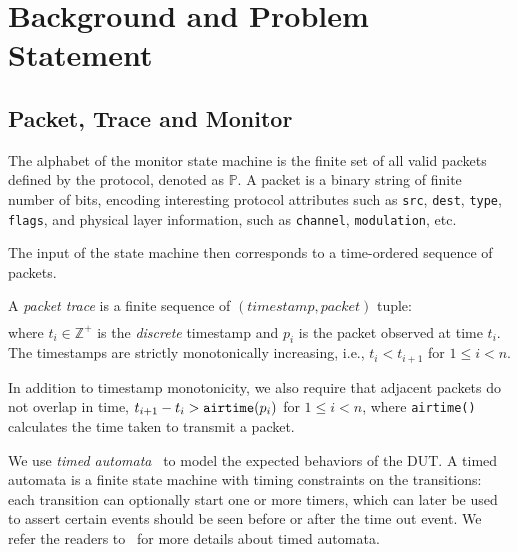 \section{Background and Problem Statement}
\label{sec:background}

\subsection{Packet, Trace and Monitor}
\label{subsec:basic}

The alphabet of the monitor state machine is the finite set of all valid packets
defined by the protocol, denoted as $\mathbb{P}$.  A packet is a binary string
of finite number of bits, encoding interesting protocol attributes such as
\texttt{src}, \texttt{dest}, \texttt{type}, \texttt{flags}, and physical layer
information, such as \texttt{channel}, \texttt{modulation}, etc.

The input of the state machine then corresponds to a time-ordered sequence of
packets.

\begin{definition}
  A \textit{packet trace} is a finite sequence of $(timestamp, packet)$ tuple:
  \begin{align*}
    [(t_1, p_1), (t_2, p_2),\ldots,(t_n, p_n)]
  \end{align*}%
  where $t_i \in \mathbb{Z}^+$ is the \textit{discrete} timestamp and $p_i$ is the packet
  observed at time $t_i$. The timestamps are strictly monotonically increasing,
  i.e., $t_i < t_{i+1}$ for $1 \le i < n$.
\end{definition}%

In addition to timestamp monotonicity, we also require that adjacent packets do
not overlap in time, $t_{i+1}-t_i > \text{\texttt{airtime}}(p_i)$ for $1 \le i
< n$, where \texttt{airtime()} calculates the time taken to transmit a packet.

We use \textit{timed automata}~\cite{alur1994theory} to model the expected
behaviors of the DUT.  A timed automata is a finite state machine with timing
constraints on the transitions: each transition can optionally start one or more
timers, which can later be used to assert certain events should be seen before
or after the time out event. We refer the readers to~\cite{alur1994theory} for
more details about timed automata.


